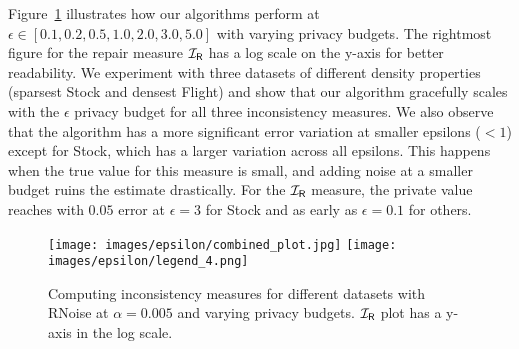 Figure~\ref{fig:varying_eps} illustrates how our algorithms perform at $\epsilon \in [0.1, 0.2, 0.5, 1.0, 2.0, 3.0, 5.0]$ with varying privacy budgets. The rightmost figure for the repair measure $\mathcal{I_\mathsf{R}}$ has a log scale on the y-axis for better readability. We experiment with three datasets of different density properties (sparsest Stock and densest Flight) and show that our algorithm gracefully scales with the $\epsilon$ privacy budget for all three inconsistency measures. We also observe that the algorithm has a more significant error variation at smaller epsilons ($<1$) except for Stock, which has a larger variation across all epsilons. This happens when the true value for this measure is small, and adding noise at a smaller budget ruins the estimate drastically. For the $\mathcal{I_\mathsf{R}}$ measure, the private value reaches with $0.05$ error at $\epsilon=3$ for Stock and as early as $\epsilon=0.1$ for others. 

\begin{figure}
    \centering
    \texttt{[image: images/epsilon/combined\_plot.jpg]}
    \texttt{[image: images/epsilon/legend\_4.png]}
    \caption{Computing inconsistency measures for different datasets with RNoise at $\alpha = 0.005$ and varying privacy budgets. $\mathcal{I_\mathsf{R}}$ plot has a y-axis in the log scale.}
    \label{fig:varying_eps}
\end{figure}


